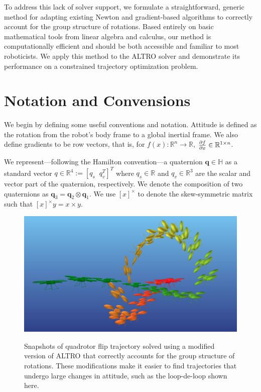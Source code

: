 \documentclass[letterpaper, 10 pt, conference]{ieeeconf}  %
\newcommand{\R}{\mathbb{R}}
\newcommand{\skewmat}[1]{[#1]^\times}
\newcommand{\q}{\textbf{q}}
\begin{document}
    To address this lack of solver support, we formulate a straightforward, generic
    method for adapting existing Newton and gradient-based algorithms to correctly
    account for the group structure of rotations. Based entirely on basic mathematical
    tools from linear algebra and calculus, our method is computationally efficient and
    should be both accessible and familiar to most roboticists. We apply this method to
    the ALTRO solver \cite{howell2019altro} and demonstrate its performance on a 
    constrained trajectory optimization problem.

\section{Notation and Convensions}

    We begin by defining some useful conventions and notation. 
    Attitude is defined as the rotation from the robot's body frame to a global inertial 
        frame. 
    We also define gradients to be row vectors, that is, for 
        $f(x) : \R^n \to \R$, $\pdv{f}{x} \in \R^{1\times n}$.

    We represent---following the Hamilton convention---a quaternion $\q \in \mathbb{H}$
    as a standard vector $q \in \R^4 := [q_s \;\; q_v^T]^T$ where $q_s \in \R$ and $q_v
    \in \R^3$ are the scalar and vector part of the quaternion, respectively. We denote
    the composition of two quaternions as $\q_3 = \q_2 \otimes \q_1$. We use
    $\skewmat{x}$ to denote the skew-symmetric matrix such that $\skewmat{x} y = x \times
    y$.
        
    \begin{figure}
        \centering
        \includegraphics[width=\columnwidth]{figures/quadflip.png}
        \label{fig:quadflip}
        \caption{Snapshots of quadrotor flip trajectory solved using a modified version
        of ALTRO that correctly accounts for the group structure of rotations. These
        modifications make it easier to find trajectories that undergo large changes in
        attitude, such as the loop-de-loop shown here.}
    \end{figure}
\end{document}
